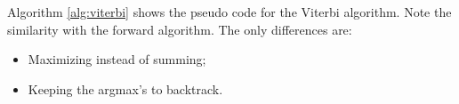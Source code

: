 
Algorithm \ref{alg:viterbi} shows the pseudo code for the Viterbi algorithm.
Note the similarity with the forward algorithm.
The only differences are:
\begin{itemize}
\item Maximizing instead of summing;
\item Keeping the argmax's to backtrack.
\end{itemize}



